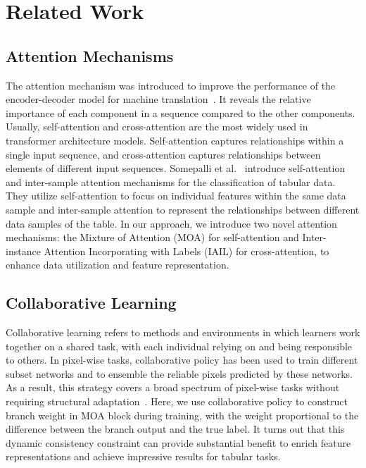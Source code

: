\section{Related Work}
\subsection{Attention Mechanisms}
The attention mechanism was introduced to improve the performance of the encoder-decoder model for machine translation~\cite{vaswani2017attention}. It reveals the relative importance of each component in a sequence compared to the other components. Usually, self-attention and cross-attention are the most widely used in transformer architecture models. Self-attention captures relationships within a single input sequence, and cross-attention captures relationships between elements of different input sequences.
Somepalli et al.~\cite{somepalli2021saint} introduce self-attention and inter-sample attention mechanisms for the classification of tabular data. They utilize self-attention to focus on individual features within the same data sample and inter-sample attention to represent the relationships between different data samples of the table.  In our approach, we introduce two novel attention mechanisms: the Mixture of Attention (MOA) for self-attention and Inter-instance Attention Incorporating with Labels (IAIL) for cross-attention, to enhance data utilization and feature representation.

\subsection{Collaborative Learning}
Collaborative learning \cite{dillenbourg1999collaborative} refers to methods and environments in which learners work together on a shared task, with each individual relying on and being responsible to others. In pixel-wise tasks, collaborative policy has been used to train different subset networks and to ensemble the reliable pixels predicted by these networks.  As a result, this strategy covers a broad spectrum of pixel-wise tasks without requiring structural adaptation~\cite{ke2020guided}. Here, we use collaborative policy to construct branch weight in MOA block during training, with the weight proportional to the difference between the branch output and the true label. It turns out that this dynamic consistency constraint can provide substantial benefit to enrich feature representations and achieve impressive results for tabular tasks.